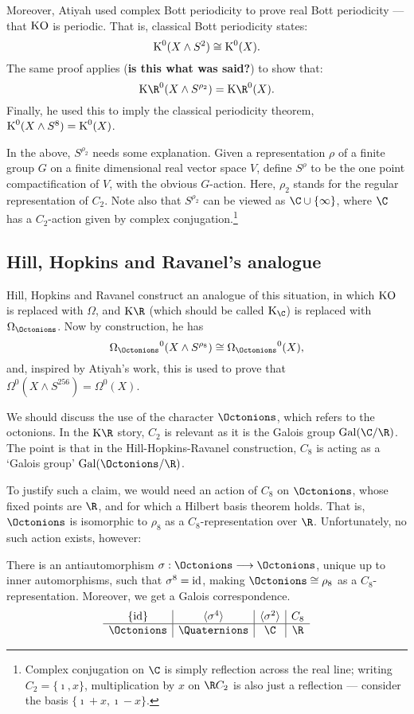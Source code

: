 \documentclass[11pt]{article}
\begin{document}
\begin{FirstWeek}
Moreover, Atiyah used complex Bott periodicity to prove real Bott periodicity
--- that $\operatorname{{KO}}$ is periodic. That is, classical Bott periodicity states:
\[\operatorname{{K}}^0(X\wedge S^2)\cong \operatorname{{K}}^0(X).\]
The same proof applies (\textbf{is this what was said?}) to show that:
\[\KR^0(X\wedge S^{\rho_2})=\KR^0(X).\]
Finally, he used this to imply the classical periodicity theorem, $\operatorname{{K}}^0(X\wedge
S^8)=\operatorname{{K}}^0(X)$.

In the above, $S^{\rho_2}$ needs some explanation. Given a representation $\rho$
of a finite group $G$ on a finite dimensional real vector space $V$, define
$S^{\rho}$ to be the one point compactification of $V$, with the obvious
$G$-action. Here, $\rho_2$ stands for the regular representation of $C_2$.
Note also that $S^{\rho_2}$ can be viewed as $\C\cup\{\infty\}$, where $\C$ has
a $C_2$-action given by complex conjugation.\footnote{Complex conjugation on
$\C$ is simply reflection across the real line; writing $C_2=\{\imath,x\}$,
multiplication by $x$ on $\R C_2$ is also just a reflection --- consider the
basis $\{\imath+x,\imath-x\}$.}

\subsection*{Hill, Hopkins and Ravanel's analogue}
Hill, Hopkins and Ravanel construct an analogue of this situation, in which $\operatorname{{KO}}$ is replaced with
$\Omega$, and $\KR$ (which should be called $\K_\C$) is replaced with $\OmegaO$.
Now by construction, he has
\[\OmegaO^0(X\wedge S^{\rho_8})\cong\OmegaO^0(X),\]
and, inspired by Atiyah's work, this is used to prove that $\Omega^0(X\wedge
S^{256})=\Omega^0(X)$.

We should discuss the use of the character $\Octonions$, which refers to the
octonions. In the $\KR$ story, $C_2$ is relevant as it is the Galois group
$\Gal(\C/\R)$. The point is that in the Hill-Hopkins-Ravanel construction, $C_8$ is acting as a
`Galois group' $\Gal(\Octonions/\R)$.

To justify such a claim, we would need an action of $C_8$ on $\Octonions$, whose
fixed points are $\R$, and for which a Hilbert basis theorem holds. That is,
$\Octonions$ is isomorphic to $\rho_8$ as a $C_8$-representation over $\R$.
Unfortunately, no such action exists, however:
\begin{fact*}
There is an antiautomorphism $\sigma:\Octonions\to \Octonions$, unique up to
inner automorphisms, such that $\sigma^8=\textup{id}$, making $\Octonions\cong\rho_8$ as
a $C_8$-representation. Moreover, we get a Galois correspondence.
\[\begin{array}{c|c|c|c}
\{\id\}&\langle\sigma^4\rangle&\langle\sigma^2\rangle&C_8\\\hline
\Octonions&\Quaternions&\C&\R
\end{array}\]
\end{fact*}

\end{FirstWeek}
\end{document}
